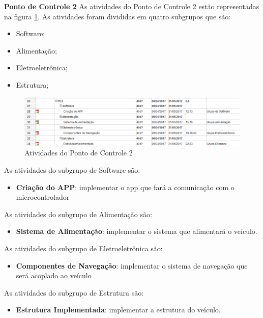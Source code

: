 		\textbf{Ponto de Controle 2}
		As atividades do Ponto de Controle 2 estão representadas na figura \ref{img:PC2}. As atividades foram divididas em quatro subgrupos que são:
		
		\begin{itemize}
			\item Software;
			\item Alimentação;
			\item Eletroeletrônica;
			\item Estrutura;
		\end{itemize}	
		
		\graphicspath{{figuras/}}
		\begin{figure}[h!]
			\centering
			\includegraphics[scale=0.60]{PC2}
			\caption{Atividades do Ponto de Controle 2}
			\label{img:PC2}
		\end{figure}	
		
		As atividades do subgrupo de Software são:
		
		\begin{itemize}
			\item \textbf{Criação do APP}: implementar o app que fará a comunicação com o microcontrolador
		\end{itemize}
		
		As atividades do subgrupo de Alimentação são:
		\begin{itemize}
			\item \textbf{Sistema de Alimentação}: implementar o sistema que alimentará o veículo.
		\end{itemize}
		
		As atividades do subgrupo de Eletroeletrônica são:
		\begin{itemize}
			\item \textbf{Componentes de Navegação}: implementar o sistema de navegação que será acoplado ao veículo
		\end{itemize}
		
		As atividades do subgrupo de Estrutura são:
		\begin{itemize}
			\item \textbf{Estrutura Implementada}: implementar a estrutura do veículo.
		\end{itemize}
		
